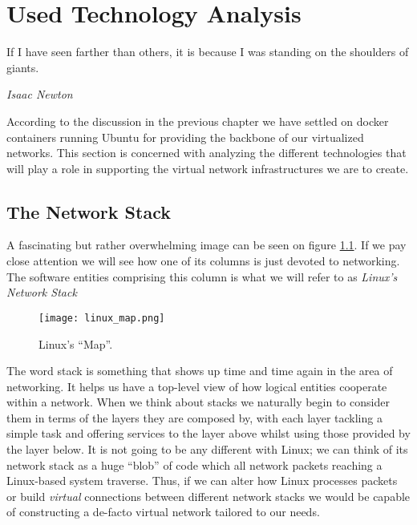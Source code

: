 \chapter{Used Technology Analysis} \label{chap:2}
    \epigraph{If I have seen farther than others, it is because I was standing on the shoulders of giants.}{\textit{Isaac Newton}}

    According to the discussion in the previous chapter we have settled on docker containers running Ubuntu for providing the backbone of our virtualized networks. This section is concerned with analyzing the different technologies that will play a role in supporting the virtual network infrastructures we are to create.\\

    \section{The Network Stack}
        A fascinating but rather overwhelming image can be seen on figure \ref{fig:linux-map}. If we pay close attention we will see how one of its columns is just devoted to networking. The software entities comprising this column is what we will refer to as \textit{Linux's Network Stack}\\

        \begin{figure}
            \centering
            \texttt{[image: linux\_map.png]}
            \caption[Linux Kernel Structure]{Linux's ``Map''. \cite{bib:linux-map}}
            \label{fig:linux-map}
        \end{figure}

         The word stack is something that shows up time and time again in the area of networking. It helps us have a top-level view of how logical entities cooperate within a network. When we think about stacks we naturally begin to consider them in terms of the layers they are composed by, with each layer tackling a simple task and offering services to the layer above whilst using those provided by the layer below. It is not going to be any different with Linux; we can think of its network stack as a huge ``blob'' of code which all network packets reaching a Linux-based system traverse. Thus, if we can alter how Linux processes packets or build \textit{virtual} connections between different network stacks we would be capable of constructing a de-facto virtual network tailored to our needs.\\

